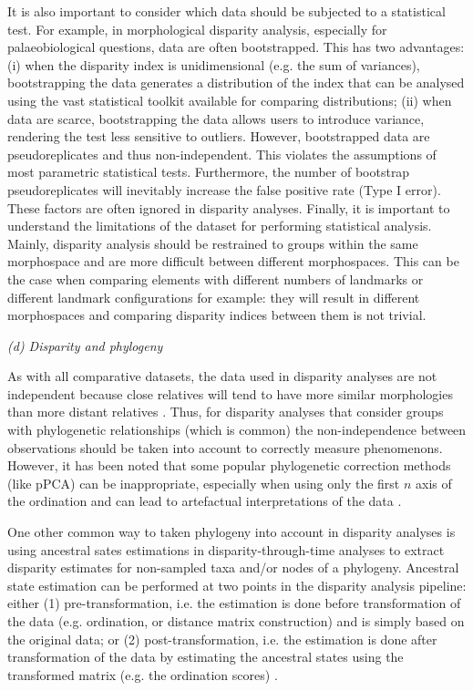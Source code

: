 \documentclass[12pt,letterpaper]{article}
\renewcommand{\subsection}[1]{%
\bigskip
\begin{center}
\begin{large}
\normalfont\itshape #1
\end{large}
\end{center}}
\begin{document}
It is also important to consider which data should be subjected to a statistical test.
For example, in morphological disparity analysis, especially for palaeobiological questions, data are often bootstrapped.
This has two advantages: (i) when the disparity index is unidimensional (e.g. the sum of variances), bootstrapping the data generates a distribution of the index that can be analysed using the vast statistical toolkit available for comparing distributions; (ii) when data are scarce, bootstrapping the data allows users to introduce variance, rendering the test less sensitive to outliers.
However, bootstrapped data are pseudoreplicates and thus non-independent.
This violates the assumptions of most parametric statistical tests.
Furthermore, the number of bootstrap pseudoreplicates will inevitably increase the false positive rate (Type I error).
These factors are often ignored in disparity analyses.
Finally, it is important to understand the limitations of the dataset for performing statistical analysis.
Mainly, disparity analysis should be restrained to groups within the same morphospace and are more difficult between different morphospaces.
This can be the case when comparing elements with different numbers of landmarks or different landmark configurations for example: they will result in different morphospaces and comparing disparity indices between them is not trivial.


\subsection{(d) Disparity and phylogeny}
\label{section:phylo}

As with all comparative datasets, the data used in disparity analyses are not independent because close relatives will tend to have more similar morphologies than more distant relatives \citep{Harvey1998-xg}.
Thus, for disparity analyses that consider groups with phylogenetic relationships (which is common) the non-independence between observations should be taken into account to correctly measure phenomenons.
However, it has been noted that some popular phylogenetic correction methods (like pPCA) can be inappropriate, especially when using only the first $n$ axis of the ordination and can lead to artefactual interpretations of the data \citep[such as wrongly supported ``early burst'' type patterns;][]{Uyeda2015}.

One other common way to taken phylogeny into account in disparity analyses is using ancestral sates estimations in disparity-through-time analyses to extract disparity estimates for non-sampled taxa and/or nodes of a phylogeny.
Ancestral state estimation can be performed at two points in the disparity analysis pipeline: either (1) pre-transformation, i.e. the estimation is done before transformation of the data (e.g. ordination, or distance matrix construction) and is simply based on the original data; or (2) post-transformation, i.e. the estimation is done after transformation of the data by estimating the ancestral states using the transformed matrix (e.g. the ordination scores) \citep{lloyd2018}.
\end{document}
